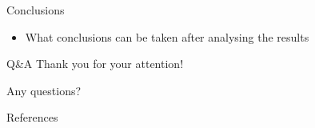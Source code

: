 \documentclass[pdf]{beamer}
\begin{document}
\begin{frame}{Conclusions}
    \begin{itemize}
        \item What conclusions can be taken after analysing the results
    \end{itemize}
\end{frame}

\begin{frame}{Q\&A}
    \centering
    \Huge{Thank you for your attention!}

    \vspace{0.5cm}

    \Large{Any questions?}
\end{frame}

\begin{frame}[allowframebreaks]{References}
    
\end{frame}
\end{document}
